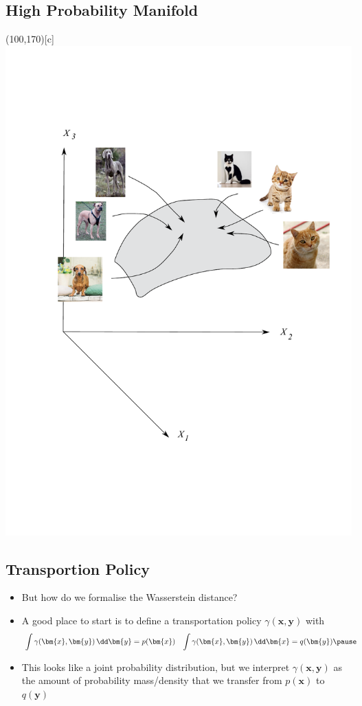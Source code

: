 \begin{slide}
\section[-2]{High Probability Manifold}

\begin{center}
  \makebox(100,170)[c]{\includegraphics[width=0.7\linewidth]{manifold}}
\end{center}
\end{slide}


\begin{slide}
\section{Transportion Policy}

\begin{PauseHighLight}
  \begin{itemize}
  \item But how do we formalise the Wasserstein distance?\pause
  \item A good place to start is to define a transportation policy
    $\gamma(\bm{x},\bm{y})$ with
    \begin{align*}
      \int \gamma(\bm{x},\bm{y}) \, \dd \bm{y} &= p(\bm{x}) &
      \int \gamma(\bm{x},\bm{y}) \, \dd \bm{x} &= q(\bm{y})\pause
    \end{align*}
  \item This looks like a joint probability distribution, but we
    interpret $\gamma(\bm{x},\bm{y})$ as the amount of probability
    mass/density that we transfer from $p(\bm{x})$ to $q(\bm{y})$\pause
  \end{itemize}
\end{PauseHighLight}

\end{slide}

